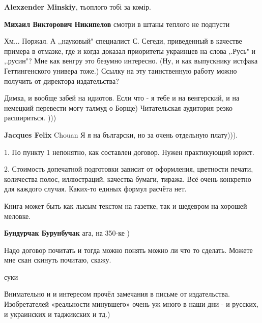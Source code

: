 \begin{itemize}
\begin{itemize} %
\textbf{Alexzender Minskiy}, тьоплого тобі за комір.

\textbf{Михаил Викторович Никипелов} смотри в штаны теплого не подпусти
\end{itemize} %


Хм... Поржал. А ,,науковый" специалист С. Сегеди, приведенный в качестве
примера в отмазке, где и когда доказал приоритеты украинцев на слова ,.Русь" и
,.русин"? Мне как венгру это безумно интересно. (Ну, и как выпускнику истфака
Геттингенского универа тоже.) Ссылку на эту таинственную работу можно получить
от директора издательства?



Димка, и вообще забей на идиотов. Если что - я тебе и на венгерский, и на
немецкий перевести могу талмуд о Борще) Читательская аудитория резко
расшириться. )))

\begin{itemize} %
\textbf{Jacques Felix} Chouan Я я на български, но за очень отдельную плату))).
\end{itemize} %


1. По пункту 1 непонятно, как составлен договор. Нужен практикующий юрист.

2. Стоимость допечатной подготовки зависит от оформления, цветности печати,
количества полос, иллюстраций, качества бумаги, тиража. Всё очень конкретно для
каждого случая. Каких-то единых формул расчёта нет.

Книга может быть как лысым текстом на газетке, так и шедевром на хорошей
меловке.

\begin{itemize} %
\textbf{Бундурчак Бурунбучак} ага, на 350-ке )
\end{itemize} %

Надо договор почитать и тогда можно понять можно ли что то сделать. Можете мне скан скинуть почитаю, скажу.

суки


Внимательно и и интересом прочёл замечания в письме от издательства.
Изобретателей «реальности минувшего» очень уж много в наши дни - и русских, и
украинских и таджикских и тд.)


\end{itemize}
